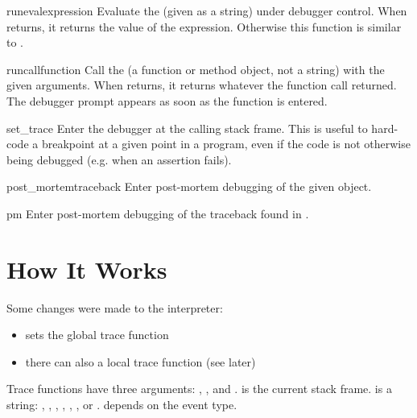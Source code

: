\begin{funcdesc}{runeval}{expression}
Evaluate the  (given as a string) under debugger
control.  When  returns, it returns the value of the
expression.  Otherwise this function is similar to
.
\end{funcdesc}

\begin{funcdesc}{runcall}{function}
Call the  (a function or method object, not a string)
with the given arguments.  When  returns, it returns
whatever the function call returned.  The debugger prompt appears as
soon as the function is entered.
\end{funcdesc}

\begin{funcdesc}{set_trace}{}
Enter the debugger at the calling stack frame.  This is useful to
hard-code a breakpoint at a given point in a program, even if the code
is not otherwise being debugged (e.g. when an assertion fails).
\end{funcdesc}

\begin{funcdesc}{post_mortem}{traceback}
Enter post-mortem debugging of the given  object.
\end{funcdesc}

\begin{funcdesc}{pm}{}
Enter post-mortem debugging of the traceback found in
.
\end{funcdesc}

\section{How It Works \label{debugger-hooks}}

Some changes were made to the interpreter:

\begin{itemize}
\item {} sets the global trace function
\item there can also a local trace function (see later)
\end{itemize}

Trace functions have three arguments: , , and
.  is the current stack frame.   is a
string: , , , ,
 , , or . 
 depends on the event type.

